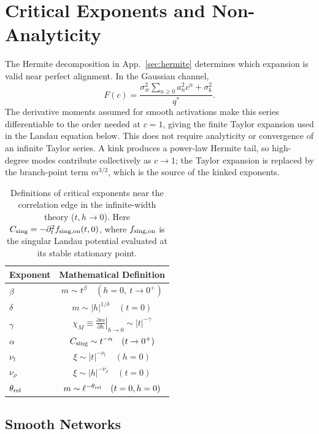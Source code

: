 \section{Critical Exponents and Non-Analyticity}
\label{ap:exponent_derivations}

The Hermite decomposition in App.~\ref{sec:hermite} determines which expansion is valid near perfect alignment. In the Gaussian channel,
\begin{equation}
F(c)=\frac{\sigma_w^2\sum_{n\ge0}a_n^2 c^n+\sigma_b^2}{q^*}.
\end{equation}
The derivative moments assumed for smooth activations make this series differentiable to the order needed at $c=1$, giving the finite Taylor expansion used in the Landau equation below. This does not require analyticity or convergence of an infinite Taylor series. A kink produces a power-law Hermite tail, so high-degree modes contribute collectively as \(c\to1\); the Taylor expansion is replaced by the branch-point term \(m^{3/2}\), which is the source of the kinked exponents.

\begin{table}[h]
\caption{Definitions of critical exponents near the correlation edge in the infinite-width theory ($t,h\to0$). Here $C_{\rm sing}=-\partial_t^2 f_{\rm sing,on}(t,0)$, where $f_{\rm sing,on}$ is the singular Landau potential evaluated at its stable stationary point.}
\label{tab:math_exponents}
\centering
\renewcommand{\arraystretch}{1.8}
\begin{tabular}{lc}
\toprule
Exponent & Mathematical Definition \\
\midrule
$\beta$ & $m \sim t^\beta \quad (h=0,\ t\to0^+)$ \\
$\delta$ & $m \sim |h|^{1/\delta} \quad (t=0)$ \\
$\gamma$ & $\chi_M \equiv \left. \frac{\partial m}{\partial h} \right|_{h \to 0} \sim |t|^{-\gamma}$ \\
$\alpha$ & $C_{\rm sing} \sim t^{-\alpha} \quad (t\to0^+)$ \\
$\nu_t$ & $\xi \sim |t|^{-\nu_t} \quad (h=0)$ \\
$\nu_\rho$ & $\xi \sim |h|^{-\nu_\rho} \quad (t=0)$ \\
$\theta_{\rm rel}$ & $m \sim \ell^{-\theta_{\rm rel}} \quad (t=0, h=0)$ \\
\bottomrule
\end{tabular}
\end{table}

\subsection{Smooth Networks}

